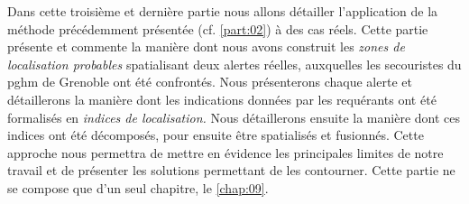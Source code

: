 Dans cette troisième et dernière partie nous allons détailler
l’application de la méthode précédemment présentée
(cf. \autoref{part:02}) à des cas réels. Cette partie présente et
commente la manière dont nous avons construit les \emph{zones de
  localisation probables} spatialisant deux alertes réelles,
auxquelles les secouristes du \ac{pghm} de Grenoble ont été
confrontés. Nous présenterons chaque alerte et détaillerons la manière
dont les indications données par les requérants ont été formalisés en
\emph{indices de localisation.} Nous détaillerons ensuite la manière
dont ces indices ont été décomposés, pour ensuite être spatialisés et
fusionnés. Cette approche nous permettra de mettre en évidence les
principales limites de notre travail et de présenter les solutions
permettant de les contourner. Cette partie ne se compose que d'un seul
chapitre, le \ref{chap:09}.


